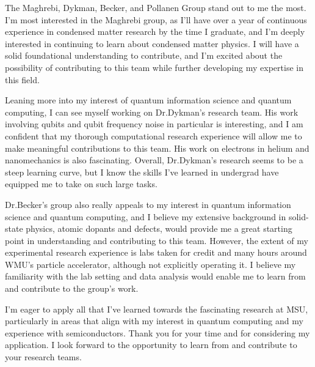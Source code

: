 \documentclass[11pt]{article}
\newcommand{\schoolabbr}{MSU}
\begin{document}
The Maghrebi, Dykman, Becker, and Pollanen Group stand out to me the most. I'm most interested in the Maghrebi group, as I'll have over a year of continuous experience in condensed matter research by the time I graduate, and I'm deeply interested in continuing to learn about condensed matter physics. I will have a solid foundational understanding to contribute, and I'm excited about the possibility of contributing to this team while further developing my expertise in this field.

Leaning more into my interest of quantum information science and quantum computing, I can see myself working on Dr.\@ Dykman's research team. His work involving qubits and qubit frequency noise in particular is interesting, and I am confident that my thorough computational research experience will allow me to make meaningful contributions to this team. His work on electrons in helium and nanomechanics is also fascinating. Overall, Dr.\@ Dykman's research seems to be a steep learning curve, but I know the skills I've learned in undergrad have equipped me to take on such large tasks.

Dr.\@ Becker's group also really appeals to my interest in quantum information science and quantum computing, and I believe my extensive background in solid-state physics, atomic dopants and defects, would provide me a great starting point in understanding and contributing to this team. However, the extent of my experimental research experience is labs taken for credit and many hours around WMU's particle accelerator, although not explicitly operating it. I believe my familiarity with the lab setting and data analysis would enable me to learn from and contribute to the group's work. 

I'm eager to apply all that I've learned towards the fascinating research at \schoolabbr{}, particularly in areas that align with my interest in quantum computing and my experience with semiconductors. Thank you for your time and for considering my application. I look forward to the opportunity to learn from and contribute to your research teams.
\end{document}
